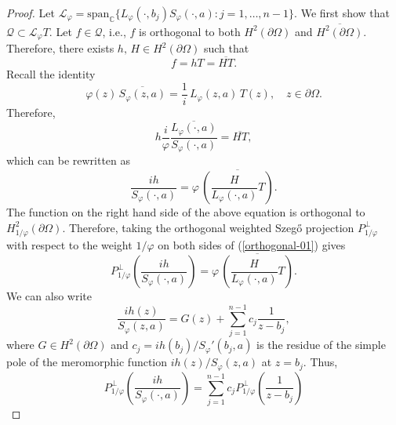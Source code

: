 \documentclass[11pt, reqno]{amsart}
\numberwithin{equation}{section}
\begin{document}
\begin{proof}
Let $\mathcal{L}_{\varphi}=\text{span}_{\mathbb{C}}\{L_{\varphi}(\cdot,b_j)S_{\varphi}(\cdot,a) : j=1,\ldots,n-1\}$. We first show that $\mathcal{Q}\subset \mathcal{L}_{\varphi}T$. Let $f\in\mathcal{Q}$, i.e., $f$ is orthogonal to both $H^2(\partial\Omega)$ and $\overline{H^2(\partial\Omega)}$. Therefore, there exists $h,\,H\in H^2(\partial\Omega)$ such that 
\begin{equation}\label{orthogonal}
f= hT =\overline{HT}.
\end{equation}
Recall the identity
\begin{equation}\label{BdyRelation}
\varphi(z)\,\overline{S_{\varphi}(z,a)}=\frac{1}{i} \,L_{\varphi}(z,a)\, T(z),\quad z\in\partial\Omega.
\end{equation}
Therefore, 
\[
h \frac{i}{\varphi}\frac{\overline{L_{\varphi}(\cdot,a)}}{S_{\varphi}(\cdot,a)}= \overline{HT},
\]
which can be rewritten as 
\begin{equation}\label{orthogonal-01}
\frac{i h}{S_{\varphi}(\cdot,a)}= \varphi\,\overline{\left(\frac{H}{L_{\varphi}(\cdot,a)} T\right)}.
\end{equation}
The function on the right hand side of the above equation is orthogonal to $H^2_{1/\varphi}(\partial\Omega)$. Therefore, taking the orthogonal weighted Szeg\H{o} projection $P^{\perp}_{1/\varphi}$ with respect to the weight $1/\varphi$ on both sides of (\ref{orthogonal-01}) gives
\begin{equation}\label{Orthogonal1}
P^{\perp}_{1/\varphi} \left(\frac{i h}{S_{\varphi}(\cdot,a)}\right) = \varphi\,\overline{\left(\frac{H}{L_{\varphi}(\cdot,a)} T\right)}.
\end{equation}
We can also write
\[
\frac{i h(z)}{S_{\varphi}(z,a)}= G(z) + \sum_{j=1}^{n-1}c_j \frac{1}{z-b_j},
\]
where $G\in H^2(\partial\Omega)$ and $c_j=i h(b_j)/ {S_{\varphi}}'(b_j,a)$ is the residue of the simple pole of the meromorphic function $i h(z)/S_{\varphi}(z,a)$ at $z=b_j$. Thus,
\begin{equation}\label{Orthogonal2}
P^{\perp}_{1/\varphi} \left(\frac{i h}{S_{\varphi}(\cdot,a)}\right) = \sum_{j=1}^{n-1} c_j P^{\perp}_{1/\varphi}\left(\frac{1}{z-b_j}\right) 
\end{equation}
\medskip


\end{proof}
\end{document}
